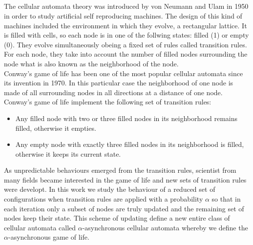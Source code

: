 \documentclass[../proyecto.tex]{book}
\begin{document}
\thispagestyle{empty}

\begin{center}
  {\large\bfseries \ProjectTitleEng}\\
\end{center}

\begin{center}
  \AuthorName\\
  \vspace{0.7cm}
  \\

  \vspace{0.7cm}
  \\
\end{center}

The cellular automata theory was introduced by von Neumann and Ulam in 1950 in order to study artificial self reproducing machines. The design of this kind of machines included the environment in which they evolve, a rectangular lattice. It is filled with cells, so each node is in one of the follwing states: filled (1) or empty (0). They evolve simultaneously obeing a fixed set of rules called transition rules. For each node, they take into account the number of filled nodes surrounding the node what is also known as the neighborhood of the node. \\

Conway's game of life has been one of the most popular cellular automata since its invention in 1970. In this particular case the neighborhood of one node is made of all surrounding nodes in all directions at a distance of one node. Conway's game of life implement the following set of transition rules: 
\begin{itemize}
\item Any filled node with two or three filled nodes in its neighborhood remains filled, otherwise it empties.
\item Any empty node with exactly three filled nodes in its neighborhood is filled, otherwise it keeps its current state.
\end{itemize} 

As unpredictable behaviours emerged from the transition rules, scientist from many fields became interested in the game of life and new sets of transition rules were developt. In this work we study the behaviour of a reduced set of configurations when transition rules are applied with a probability $\alpha$ so that in each iteration only a subset of nodes are truly updated and the remaining set of nodes keep their state. This scheme of updating define a new entire class of cellular automata called $\alpha$-asynchronous cellular automata whereby we define the $\alpha$-asynchronous game of life. \\
\end{document}
